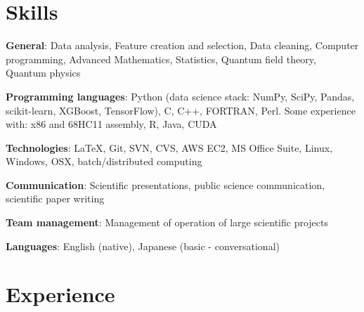 \documentclass[margin,line]{resume}
\begin{document}
\begin{resume}
    \section{\mysidestyle Skills}
    \begin{list2}
        \item \textbf{General}: Data analysis, Feature creation and selection, Data cleaning, Computer programming, Advanced Mathematics, Statistics, Quantum field theory, Quantum physics
        \item \textbf{Programming languages}: Python (data science stack: NumPy, SciPy, Pandas, scikit-learn, XGBoost, TensorFlow), C, C++, FORTRAN, Perl. Some experience with: x86 and 68HC11 assembly, R, Java, CUDA
        \item \textbf{Technologies}: \LaTeX, Git, SVN, CVS, AWS EC2, MS Office Suite, Linux, Windows, OSX, batch/distributed computing
        \item \textbf{Communication}: Scientific presentations, public science communication, scientific paper writing
        \item \textbf{Team management}: Management of operation of large scientific projects
        \item \textbf{Languages}: English (native), Japanese (basic - conversational)
    \end{list2}




    \section{\mysidestyle Experience}

    \begin{list2}


\end{list2}
\end{resume}
\end{document}
